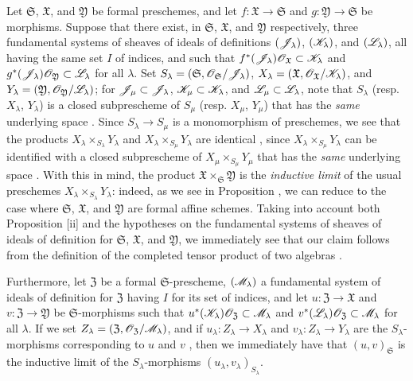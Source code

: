 \begin{env}[10.7.4]
\label{I.10.7.4}
Let $\mathfrak{S}$, $\mathfrak{X}$, and $\mathfrak{Y}$ be formal preschemes, and let $f:\mathfrak{X}\to\mathfrak{S}$ and $g:\mathfrak{Y}\to\mathfrak{S}$ be morphisms.
Suppose that there exist, in $\mathfrak{S}$, $\mathfrak{X}$, and $\mathfrak{Y}$ respectively, three fundamental systems of sheaves of ideals of definitions $(\mathscr{J}_\lambda)$, $(\mathscr{K}_\lambda)$, and $(\mathscr{L}_\lambda)$, all having the same set $I$ of indices, and such that $f^*(\mathscr{J}_\lambda)\mathscr{O}_\mathfrak{X}\subset\mathscr{K}_\lambda$ and $g^*(\mathscr{J}_\lambda)\mathscr{O}_\mathfrak{Y}\subset\mathscr{L}_\lambda$ for all $\lambda$.
Set $S_\lambda=(\mathfrak{S},\mathscr{O}_\mathfrak{S}/\mathscr{J}_\lambda)$, $X_\lambda=(\mathfrak{X},\mathscr{O}_\mathfrak{X}/\mathscr{K}_\lambda)$, and $Y_\lambda=(\mathfrak{Y},\mathscr{O}_\mathfrak{Y}/\mathscr{L}_\lambda)$; for $\mathscr{J}_\mu\subset\mathscr{J}_\lambda$, $\mathscr{K}_\mu\subset\mathscr{K}_\lambda$, and $\mathscr{L}_\mu\subset\mathscr{L}_\lambda$, note that $S_\lambda$ (resp. $X_\lambda$, $Y_\lambda$) is a closed subprescheme of $S_\mu$ (resp. $X_\mu$, $Y_\mu$) that has the \emph{same}
underlying space .
Since $S_\lambda\to S_\mu$ is a monomorphism of preschemes, we see that the products $X_\lambda\times_{S_\lambda}Y_\lambda$ and $X_\lambda\times_{S_\mu}Y_\lambda$ are identical , since $X_\lambda\times_{S_\mu}Y_\lambda$ can be identified with a closed subprescheme of $X_\mu\times_{S_\mu}Y_\mu$ that has the \emph{same} underlying space .
With this in mind, the product $\mathfrak{X}\times_\mathfrak{S}\mathfrak{Y}$ is the \emph{inductive limit} of the usual preschemes $X_\lambda\times_{S_\lambda}Y_\lambda$: indeed, as we see in Proposition , we can reduce to the case where $\mathfrak{S}$, $\mathfrak{X}$, and $\mathfrak{Y}$ are formal affine schemes.
Taking into account both Proposition [ii] and the hypotheses on the fundamental systems of sheaves of ideals of definition for $\mathfrak{S}$, $\mathfrak{X}$, and $\mathfrak{Y}$, we immediately see that our claim follows from the definition of the completed tensor product of two algebras .

Furthermore, let $\mathfrak{Z}$ be a formal $\mathfrak{S}$-prescheme, $(\mathscr{M}_\lambda)$ a fundamental system of ideals of definition for $\mathfrak{Z}$ having $I$ for its set of indices, and let $u:\mathfrak{Z}\to\mathfrak{X}$ and $v:\mathfrak{Z}\to\mathfrak{Y}$ be $\mathfrak{S}$-morphisms such that $u^*(\mathscr{K}_\lambda)\mathscr{O}_\mathfrak{Z}\subset\mathscr{M}_\lambda$ and $v^*(\mathscr{L}_\lambda)\mathscr{O}_\mathfrak{Z}\subset\mathscr{M}_\lambda$ for all $\lambda$.
If we set $Z_\lambda=(\mathfrak{Z},\mathscr{O}_\mathfrak{Z}/\mathscr{M}_\lambda)$, and if $u_\lambda:Z_\lambda\to X_\lambda$ and $v_\lambda:Z_\lambda\to Y_\lambda$ are the $S_\lambda$-morphisms corresponding to $u$ and $v$ , then we immediately have that $(u,v)_\mathfrak{S}$ is the inductive limit of the $S_\lambda$-morphisms $(u_\lambda,v_\lambda)_{S_\lambda}$.


\end{env}

